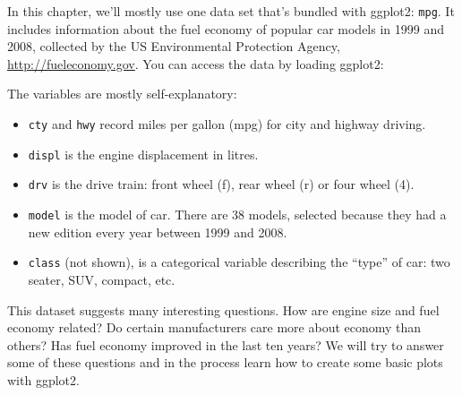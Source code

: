 In this chapter, we'll mostly use one data set that's bundled with
ggplot2: \texttt{mpg}. It includes information about the fuel economy of
popular car models in 1999 and 2008, collected by the US Environmental
Protection Agency, \url{http://fueleconomy.gov}. You can access the data
by loading ggplot2: 

\begin{Shaded}
\begin{Highlighting}[]
\CommentTok{#> }
\end{Highlighting}
\end{Shaded}

The variables are mostly self-explanatory:

\begin{itemize}
\item
  \texttt{cty} and \texttt{hwy} record miles per gallon (mpg) for city
  and highway driving.
\item
  \texttt{displ} is the engine displacement in litres.
\item
  \texttt{drv} is the drive train: front wheel (f), rear wheel (r) or
  four wheel (4).
\item
  \texttt{model} is the model of car. There are 38 models, selected
  because they had a new edition every year between 1999 and 2008.
\item
  \texttt{class} (not shown), is a categorical variable describing the
  ``type'' of car: two seater, SUV, compact, etc.
\end{itemize}

This dataset suggests many interesting questions. How are engine size
and fuel economy related? Do certain manufacturers care more about
economy than others? Has fuel economy improved in the last ten years? We
will try to answer some of these questions and in the process learn how
to create some basic plots with ggplot2.

